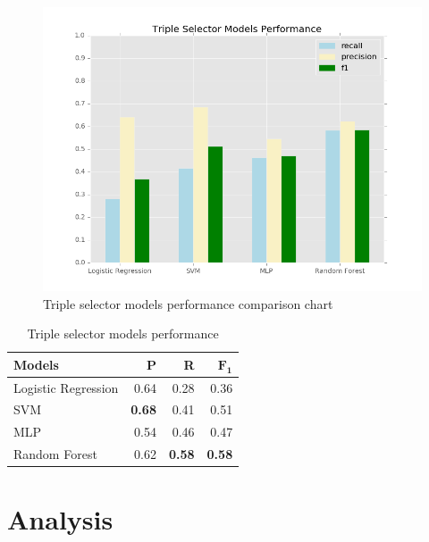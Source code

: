 \documentclass[conference,compsoc]{IEEEtran}
\begin{document}

\lipsum[1-2]

\begin{figure}
\includegraphics[scale=0.4]{models_performance}
\caption{Triple selector models performance comparison chart}
\label{fig_models_performance}
\end{figure}

\begin{table}[!t]
\renewcommand{\arraystretch}{1.5}
\caption{Triple selector models performance}
\label{table_models_performance}
\centering
\begin{tabular}{l r r r}
\hline
\textbf{Models} & \textbf{P} & \textbf{R} & $\mathbf{F_1}$ \\
\hline
Logistic Regression & 0.64 & 0.28 & 0.36 \\
SVM & \textbf{0.68} & 0.41 & 0.51 \\
MLP & 0.54 & 0.46 & 0.47 \\
Random Forest & 0.62 & \textbf{0.58} & \textbf{0.58} \\
\hline
\end{tabular}
\end{table}

\section{Analysis}
\end{document}
